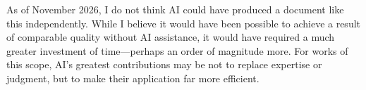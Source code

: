 \documentclass[11pt]{article}
\begin{document}
As of November 2026, I do not think AI could have produced a document like this independently.
While I believe it would have been possible to achieve a result of comparable quality without AI assistance,
it would have required a much greater investment of time---perhaps an order of magnitude more.
For works of this scope, AI's greatest contributions may be not to replace expertise or judgment,
but to make their application far more efficient.



\end{document}
